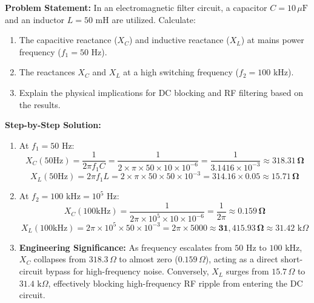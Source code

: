 \begin{tcolorbox}[colback=white,colframe=navyblue,title=\textbf{Problem 4: Capacitive and Inductive Reactance at Power and High Frequencies}]
\textbf{Problem Statement:} In an electromagnetic filter circuit, a capacitor $C = 10\,\mu\text{F}$ and an inductor $L = 50\text{ mH}$ are utilized. Calculate:
\begin{enumerate}[label=(\alph*),leftmargin=*]
    \item The capacitive reactance ($X_C$) and inductive reactance ($X_L$) at mains power frequency ($f_1 = 50\text{ Hz}$).
    \item The reactances $X_C$ and $X_L$ at a high switching frequency ($f_2 = 100\text{ kHz}$).
    \item Explain the physical implications for DC blocking and RF filtering based on the results.
\end{enumerate}
\textbf{Step-by-Step Solution:}
\begin{enumerate}[label=(\alph*),leftmargin=*]
    \item At $f_1 = 50\text{ Hz}$:
    \[
    X_C(50\text{Hz}) = \frac{1}{2\pi f_1 C} = \frac{1}{2 \times \pi \times 50 \times 10 \times 10^{-6}} = \frac{1}{3.1416 \times 10^{-3}} \approx \mathbf{318.31\,\Omega}
    \]
    \[
    X_L(50\text{Hz}) = 2\pi f_1 L = 2 \times \pi \times 50 \times 50 \times 10^{-3} = 314.16 \times 0.05 \approx \mathbf{15.71\,\Omega}
    \]
    \item At $f_2 = 100\text{ kHz} = 10^5\text{ Hz}$:
    \[
    X_C(100\text{kHz}) = \frac{1}{2\pi \times 10^5 \times 10 \times 10^{-6}} = \frac{1}{2\pi} \approx \mathbf{0.159\,\Omega}
    \]
    \[
    X_L(100\text{kHz}) = 2\pi \times 10^5 \times 50 \times 10^{-3} = 2\pi \times 5000 \approx \mathbf{31,415.93\,\Omega} \approx 31.42\text{ k}\Omega
    \]
    \item \textbf{Engineering Significance:} As frequency escalates from $50\text{ Hz}$ to $100\text{ kHz}$, $X_C$ collapses from $318.3\,\Omega$ to almost zero ($0.159\,\Omega$), acting as a direct short-circuit bypass for high-frequency noise. Conversely, $X_L$ surges from $15.7\,\Omega$ to $31.4\text{ k}\Omega$, effectively blocking high-frequency RF ripple from entering the DC circuit.
\end{enumerate}
\end{tcolorbox}

